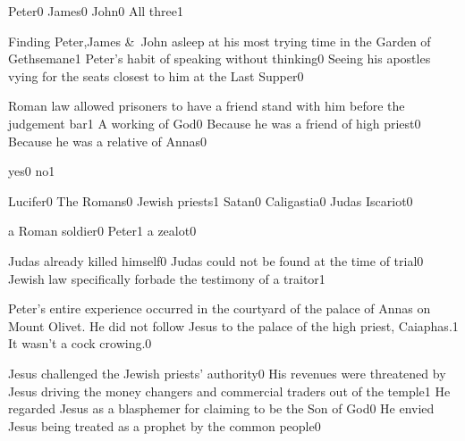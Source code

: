 {Peter}{0}
{James}{0}
{John}{0}
{All three}{1}
\qstop

{Finding Peter,James \&\ John asleep at his most trying time in the Garden of Gethsemane}{1}
{Peter's habit of speaking without thinking}{0}
{Seeing his apostles vying for the seats closest to him at the Last Supper}{0}
\qstop


{Roman law allowed prisoners to have a friend stand with him before the judgement bar}{1}
{A working of God}{0}
{Because he was a friend of high priest}{0}
{Because he was a relative of Annas}{0}
\qstop

{yes}{0}
{no}{1}
\qstop

{Lucifer}{0}
{The Romans}{0}
{Jewish priests}{1}
{Satan}{0}
{Caligastia}{0}
{Judas Iscariot}{0}
\qstop

{a Roman soldier}{0}
{Peter}{1}
{a zealot}{0}
\qstop


{Judas already killed himself}{0}
{Judas could not be found at the time of trial}{0}
{Jewish law specifically forbade the testimony of a traitor}{1}
\qstop

{Peter's entire experience occurred in the courtyard of the palace of Annas on Mount Olivet. He did not follow Jesus to the palace of the high priest, Caiaphas.}{1}
{It wasn't a cock crowing.}{0}
\qstop

{Jesus challenged the Jewish priests' authority}{0}
{His revenues were threatened by Jesus driving the money changers and commercial traders out of the temple}{1}
{He regarded Jesus as a blasphemer for claiming to be the Son of God}{0}
{He envied Jesus being treated as a prophet by the common people}{0}
\qstop

